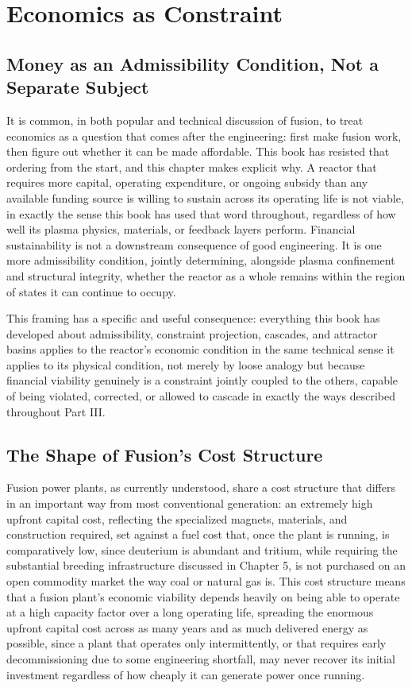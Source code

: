 \chapter{Economics as Constraint}

\section{Money as an Admissibility Condition, Not a Separate Subject}

It is common, in both popular and technical discussion of fusion, to treat economics as a question that comes after the engineering: first make fusion work, then figure out whether it can be made affordable. This book has resisted that ordering from the start, and this chapter makes explicit why. A reactor that requires more capital, operating expenditure, or ongoing subsidy than any available funding source is willing to sustain across its operating life is not viable, in exactly the sense this book has used that word throughout, regardless of how well its plasma physics, materials, or feedback layers perform. Financial sustainability is not a downstream consequence of good engineering. It is one more admissibility condition, jointly determining, alongside plasma confinement and structural integrity, whether the reactor as a whole remains within the region of states it can continue to occupy.

This framing has a specific and useful consequence: everything this book has developed about admissibility, constraint projection, cascades, and attractor basins applies to the reactor's economic condition in the same technical sense it applies to its physical condition, not merely by loose analogy but because financial viability genuinely is a constraint jointly coupled to the others, capable of being violated, corrected, or allowed to cascade in exactly the ways described throughout Part III.

\section{The Shape of Fusion's Cost Structure}

Fusion power plants, as currently understood, share a cost structure that differs in an important way from most conventional generation: an extremely high upfront capital cost, reflecting the specialized magnets, materials, and construction required, set against a fuel cost that, once the plant is running, is comparatively low, since deuterium is abundant and tritium, while requiring the substantial breeding infrastructure discussed in Chapter 5, is not purchased on an open commodity market the way coal or natural gas is. This cost structure means that a fusion plant's economic viability depends heavily on being able to operate at a high capacity factor over a long operating life, spreading the enormous upfront capital cost across as many years and as much delivered energy as possible, since a plant that operates only intermittently, or that requires early decommissioning due to some engineering shortfall, may never recover its initial investment regardless of how cheaply it can generate power once running.

